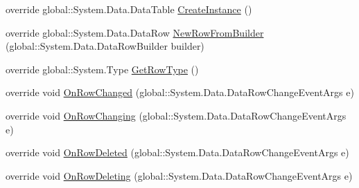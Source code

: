 \begin{DoxyCompactItemize}
\item 
override global\+::\+System.\+Data.\+Data\+Table \hyperlink{class_env_int_1_1_win32_1_1_field_tech_1_1_manager_1_1_data_sets_1_1_guide_ware_mobile_data_set_1_1_cylinder_data_table_a16eb2d36bd7516bc5af885189880a72b}{Create\+Instance} ()
\item 
override global\+::\+System.\+Data.\+Data\+Row \hyperlink{class_env_int_1_1_win32_1_1_field_tech_1_1_manager_1_1_data_sets_1_1_guide_ware_mobile_data_set_1_1_cylinder_data_table_a38286642d38d801bc251b7975c6f6d84}{New\+Row\+From\+Builder} (global\+::\+System.\+Data.\+Data\+Row\+Builder builder)
\item 
override global\+::\+System.\+Type \hyperlink{class_env_int_1_1_win32_1_1_field_tech_1_1_manager_1_1_data_sets_1_1_guide_ware_mobile_data_set_1_1_cylinder_data_table_acc365930b6087f2209b79e86611b3efe}{Get\+Row\+Type} ()
\item 
override void \hyperlink{class_env_int_1_1_win32_1_1_field_tech_1_1_manager_1_1_data_sets_1_1_guide_ware_mobile_data_set_1_1_cylinder_data_table_a01ac482823827536c078abe89876b20c}{On\+Row\+Changed} (global\+::\+System.\+Data.\+Data\+Row\+Change\+Event\+Args e)
\item 
override void \hyperlink{class_env_int_1_1_win32_1_1_field_tech_1_1_manager_1_1_data_sets_1_1_guide_ware_mobile_data_set_1_1_cylinder_data_table_a8c6b982bdfca7c8bfb0e325ce3c96ce6}{On\+Row\+Changing} (global\+::\+System.\+Data.\+Data\+Row\+Change\+Event\+Args e)
\item 
override void \hyperlink{class_env_int_1_1_win32_1_1_field_tech_1_1_manager_1_1_data_sets_1_1_guide_ware_mobile_data_set_1_1_cylinder_data_table_a2baad04e898e7aa406c5731bdddc9c85}{On\+Row\+Deleted} (global\+::\+System.\+Data.\+Data\+Row\+Change\+Event\+Args e)
\item 
override void \hyperlink{class_env_int_1_1_win32_1_1_field_tech_1_1_manager_1_1_data_sets_1_1_guide_ware_mobile_data_set_1_1_cylinder_data_table_a1a127a8fa6bae0950429d9ec3b7624ae}{On\+Row\+Deleting} (global\+::\+System.\+Data.\+Data\+Row\+Change\+Event\+Args e)
\end{DoxyCompactItemize}
